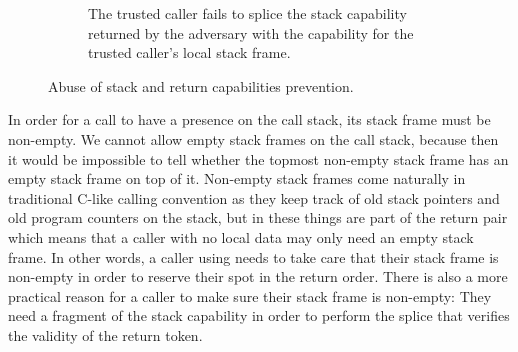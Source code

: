 \documentclass{jfp}
\begin{document}
\begin{figure}
\begin{subfigure}{0.45\linewidth}
    \caption{The trusted caller fails to splice the stack capability returned by
    the adversary with the capability for the trusted caller's local stack frame.}
    \label{fig:ret-ptr-abuse-prev}
  \end{subfigure}
  \caption{Abuse of stack and return capabilities prevention.}
\end{figure}

In order for a call to have a presence on the call stack, its stack frame must be non-empty.
We cannot allow empty stack frames on the call stack, because then it would be impossible to tell whether the topmost non-empty stack frame has an empty stack frame on top of it.
Non-empty stack frames come naturally in traditional C-like calling convention as they keep track of old stack pointers and old program counters on the stack, but in \stktokens{} these things are part of the return pair which means that a caller with no local data may only need an empty stack frame.
In other words, a caller using \stktokens{} needs to take care that their stack frame is non-empty in order to reserve their spot in the return order.
There is also a more practical reason for a \stktokens{} caller to make sure their stack frame is non-empty: They need a fragment of the stack capability in order to perform the splice that verifies the validity of the return token.
\end{document}
